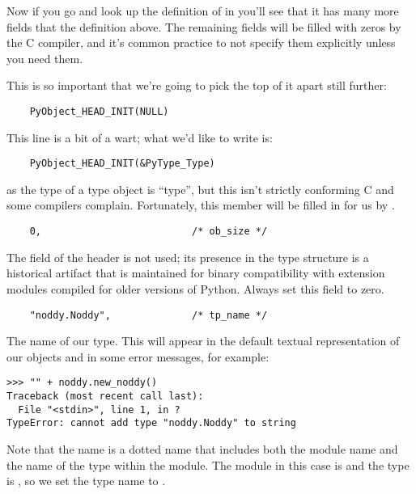 Now if you go and look up the definition of  in
 you'll see that it has many more fields that the
definition above.  The remaining fields will be filled with zeros by
the C compiler, and it's common practice to not specify them
explicitly unless you need them.  

This is so important that we're going to pick the top of it apart still
further:

\begin{verbatim}
    PyObject_HEAD_INIT(NULL)
\end{verbatim}

This line is a bit of a wart; what we'd like to write is:

\begin{verbatim}
    PyObject_HEAD_INIT(&PyType_Type)
\end{verbatim}

as the type of a type object is ``type'', but this isn't strictly
conforming C and some compilers complain.  Fortunately, this member
will be filled in for us by .

\begin{verbatim}
    0,                          /* ob_size */
\end{verbatim}

The  field of the header is not used; its presence in
the type structure is a historical artifact that is maintained for
binary compatibility with extension modules compiled for older
versions of Python.  Always set this field to zero.

\begin{verbatim}
    "noddy.Noddy",              /* tp_name */
\end{verbatim}

The name of our type.  This will appear in the default textual
representation of our objects and in some error messages, for example:

\begin{verbatim}
>>> "" + noddy.new_noddy()
Traceback (most recent call last):
  File "<stdin>", line 1, in ?
TypeError: cannot add type "noddy.Noddy" to string
\end{verbatim}

Note that the name is a dotted name that includes both the module name
and the name of the type within the module. The module in this case is 
 and the type is , so we set the type name
to .


